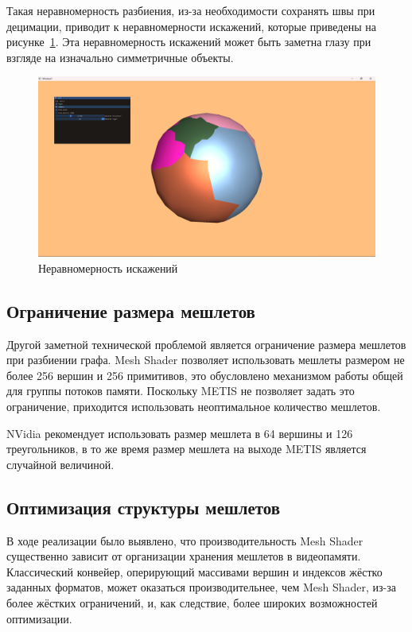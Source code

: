 Такая неравномерность разбиения, из-за необходимости сохранять швы при децимации, приводит к неравномерности искажений, которые приведены на рисунке~\ref{fig:sphere-1}.
Эта неравномерность искажений может быть заметна глазу при взгляде на изначально симметричные объекты.
\begin{figure}[ht]
    \centering
    \includegraphics[width=\textwidth]{pics/sphere1.png}
    \caption{Неравномерность искажений}
    \label{fig:sphere-1}
\end{figure}

\subsection*{Ограничение размера мешлетов}
Другой заметной технической проблемой является ограничение размера мешлетов при разбиении графа.
Mesh Shader позволяет использовать мешлеты размером не более 256 вершин и 256 примитивов, это обусловлено механизмом работы общей для группы потоков памяти.
Поскольку METIS не позволяет задать это ограничение, приходится использовать неоптимальное количество мешлетов.

NVidia рекомендует использовать размер мешлета в 64 вершины и 126 треугольников, в то же время размер мешлета на выходе METIS является случайной величиной.

\subsection*{Оптимизация структуры мешлетов}
В ходе реализации было выявлено, что производительность Mesh Shader существенно зависит от организации хранения мешлетов в видеопамяти.
Классический конвейер, оперирующий массивами вершин и индексов жёстко заданных форматов, может оказаться производительнее, чем Mesh Shader, из-за более жёстких ограничений, и, как следствие, более широких возможностей оптимизации.

